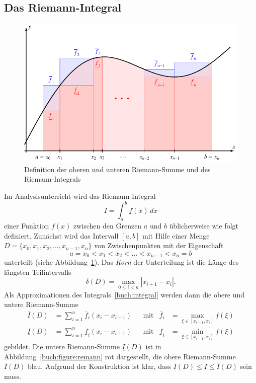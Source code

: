 \subsection{Das Riemann-Integral
\label{buch:subsection:riemann}}
\begin{figure}
\centering
\includegraphics{chapters/40-integration/figures/riemann.pdf}
\caption{Definition der oberen und unteren Riemann-Summe und des
Riemann-Integrals
%
\label{buch:figure:riemann}}
\end{figure}
Im Analysisunterricht wird das Riemann-Integral
%
\begin{equation}
I = \int_a^b f(x)\,dx
\label{buch:integral}
\end{equation}
einer Funktion $f(x)$ zwischen den Grenzen $a$ und $b$ üblicherweise
wie folgt definiert.
Zunächst wird das Intervall $[a,b]$ mit Hilfe einer Menge
$D=\{x_0,x_1,x_2,\dots,x_{n-1}, x_n\}$
von Zwischenpunkten mit der Eigenschaft
\[
a=x_0 < x_1 < x_2 < \dots < x_{n-1} < x_n = b
\]
unterteilt (siehe Abbildung~\ref{buch:figure:riemann}).
%
Das {\em Korn} der Unterteilung ist die Länge des längsten Teilintervalls
%
\[
\delta(D) = \max_{0\le i< n} |x_{i+1}-x_i|.
\]
Als Approximationen des Integrals~\eqref{buch:integral} werden dann die
%
obere und untere Riemann-Summe
%
%
%
\begin{align*}
\overline{I}(D)
&=
\sum_{i=1}^n \overline{f}_i (x_i-x_{i-1})
&&\text{mit}
&\overline{f}_i
&=
\max_{\xi\in [x_{i-1},x_i]} f(\xi)
\\
\underline{I}(D)
&=
\sum_{i=1}^n \underline{f}_i (x_i-x_{i-1})
&&\text{mit}
&\underline{f}_i
&=
\min_{\xi\in [x_{i-1},x_i]} f(\xi)
\end{align*}
gebildet.
Die untere Riemann-Summe $\underline{I}(D)$ ist in
Abbildung~\ref{buch:figure:remann} rot dargestellt, die obere Riemann-Summe
$\overline{I}(D)$ blau.
Aufgrund der Konstruktion ist klar, dass
$\underline{I}(D) \le I \le \overline{I}(D)$
sein muss.

